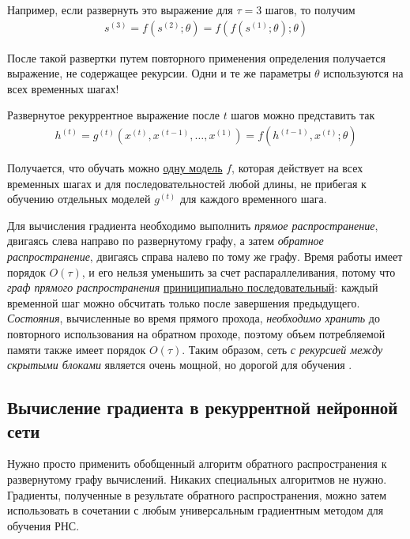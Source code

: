 \documentclass[%
	11pt,
	a4paper,
	utf8,
]{article}
\begin{document}
Например, если развернуть это выражение для $ \tau = 3 $ шагов, то получим
\begin{align*}
	s^{(3)} = f(s^{(2)}; \theta) = f(f(s^{(1)}; \theta); \theta)
\end{align*}

После такой развертки путем повторного применения определения получается выражение, не содержащее рекурсии. {\color{blue} Одни и те же параметры $ \theta $ используются на всех временных шагах!}


Развернутое рекуррентное выражение после $ t $ шагов можно представить так
\begin{align*}
	h^{(t)} = g^{(t)}(x^{(t)}, x^{(t-1)}, \ldots, x^{(1)}) = f(h^{(t-1)}, x^{(t)}; \theta)
\end{align*}

Получается, что обучать можно \underline{одну модель} $ f $, которая действует на всех временных шагах и для последовательностей любой длины, не прибегая к обучению отдельных моделей $ g^{(t)} $ для каждого временного шага.

Для вычисления градиента необходимо выполнить \emph{прямое распространение}, двигаясь слева направо по развернутому графу, а затем \emph{обратное распространение}, двигаясь справа налево по тому же графу. Время работы имеет порядок $ O(\tau) $, и его нельзя уменьшить за счет распараллеливания, потому что \emph{граф прямого распространения} \underline{приниципиально последовательный}: каждый временной шаг можно обсчитать только после завершения предыдущего. \emph{Состояния}, вычисленные во время прямого прохода, \emph{необходимо хранить} до повторного использования на обратном проходе, поэтому объем потребляемой памяти также имеет порядок $ O(\tau) $. Таким образом, сеть \emph{с рекурсией между скрытыми блоками} является очень мощной, но дорогой для обучения \cite[]{goodfellow:ml-2018}.

\subsection{Вычисление градиента в рекуррентной нейронной сети}

Нужно просто применить обобщенный алгоритм обратного распространения к развернутому графу вычислений. Никаких специальных алгоритмов не нужно. Градиенты, полученные в результате обратного распространения, можно затем использовать в сочетании с любым универсальным градиентным методом для обучения РНС.
\end{document}
